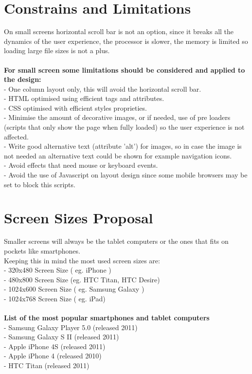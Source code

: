 \section{Constrains and Limitations}
On small screens horizontal scroll bar is not an option, since it breaks all the dynamics of the user experience, the processor is slower, the memory is limited so loading large file sizes is not a plus.\\
\\
\noindent \textbf{For small screen some limitations should be considered and applied to the design:}\\
- One column layout only, this will avoid the horizontal scroll bar.\\
- HTML optimised using efficient tags and attributes.\\
- CSS optimised with efficient styles proprieties.\\
- Minimise the amount of decorative images, or if needed, use of pre loaders (scripts that only show the page when fully loaded) so the user experience is not affected.\\
- Write good alternative text (attribute 'alt')  for images, so in case the image is not needed an alternative text could be shown for example navigation icons.\\
- Avoid effects that need mouse or keyboard events.\\
- Avoid the use of Javascript on layout design since some mobile browsers may be set to block this scripts.

\section{Screen Sizes Proposal}
Smaller screens will always be the tablet computers or the ones that fits on pockets like smartphones.\\
Keeping this in mind the most used screen sizes are:\\
- 320x480 Screen Size ( eg. iPhone )\\ 	%
- 480x800 Screen Size (eg. HTC Titan, HTC Desire)\\ %
- 1024x600 Screen Size ( eg. Samsung Galaxy )\\
- 1024x768 Screen Size ( eg. iPad)\\
\\
\noindent \textbf{List of the most popular smartphones and tablet computers}\\
- Samsung Galaxy Player 5.0 (released 2011)\\
- Samsung Galaxy S II (released 2011)\\
- Apple iPhone 4S (released 2011)\\
- Apple iPhone 4 (released 2010)\\
- HTC Titan (released 2011)\\
